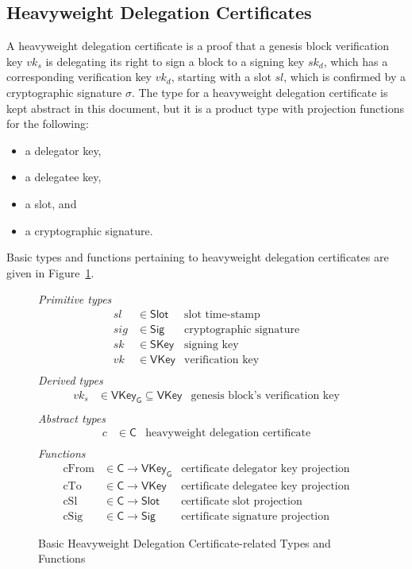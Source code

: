 \documentclass[11pt,a4paper]{article}
\newcommand{\type}[1]{\mathsf{#1}}
\newcommand{\Slot}{\type{Slot}}
\newcommand{\HCert}{\type{C}}
\newcommand{\SKey}{\type{SKey}}
\newcommand{\VKey}{\type{VKey}}
\newcommand{\VKeyGen}{\type{VKey_G}}
\newcommand{\Sig}{\type{Sig}}
\newcommand{\totalf}{\to}
\begin{document}
\subsection{Heavyweight Delegation Certificates}
\label{sec:certificates}

A heavyweight delegation certificate is a proof that a genesis block
verification key $vk_s$ is delegating its right to sign a block to a signing
key $sk_d$, which has a corresponding verification key $vk_d$, starting with a
slot $sl$, which is confirmed by a cryptographic signature $\sigma$.
%
The type for a heavyweight delegation certificate is kept abstract in this
document, but it is a product type with projection functions for the
following:
%
\begin{itemize}
\item a delegator key,
\item a delegatee key,
\item a slot, and
\item a cryptographic signature.
\end{itemize}

Basic types and functions pertaining to heavyweight delegation certificates
are given in Figure~\ref{fig:cert-defs}.

\begin{figure}
  \emph{Primitive types}
  \begin{align*}
    sl & \in \Slot    & \text{slot time-stamp}\\
   sig & \in \Sig     & \text{cryptographic signature}\\
    sk & \in \SKey    & \text{signing key}\\
    vk & \in \VKey    & \text{verification key}\\
  \end{align*}
  \emph{Derived types}
  \begin{align*}
    vk_s & \in \VKeyGen \subseteq \VKey & \text{genesis block's verification key}\\
  \end{align*}
  \emph{Abstract types}
  \begin{align*}
    c & \in \HCert  & \text{heavyweight delegation certificate} \\
  \end{align*}
  \emph{Functions}
  \begin{align*}
    \text{cFrom} & \in \HCert \totalf \VKeyGen & \text{certificate delegator key projection} \\
    \text{cTo} & \in \HCert \totalf \VKey & \text{certificate delegatee key projection} \\
    \text{cSl} & \in \HCert \totalf \Slot & \text{certificate slot projection} \\
    \text{cSig} & \in \HCert \totalf \Sig & \text{certificate signature projection}
  \end{align*}
  \caption{Basic Heavyweight Delegation Certificate-related Types and Functions}
  \label{fig:cert-defs}
\end{figure}
\end{document}
